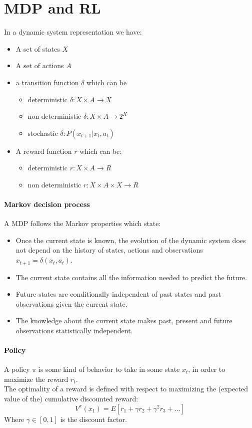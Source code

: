 \section{MDP and RL}
In a dynamic system representation we have:
\begin{itemize}
\item A set of states $X$
\item A set of actions $A$
\item a transition function $\delta$  which can be 
\begin{itemize}
\item deterministic $\delta : X\times A \to X$
\item non deterministic $\delta : X\times A \to 2^X$
\item stochastic $\delta : P(x_{t+1}|x_t,a_t)$
\end{itemize}
\item A reward function $r$ which can be:
\begin{itemize}
\item deterministic $r: X \times A \to R$
\item non deterministic $r: X \times A \times X \to R$
\end{itemize}
\end{itemize}

\paragraph{Markov decision process}
A MDP follows the Markov properties which state:
\begin{itemize}
\item Once the current state is known, the evolution of the dynamic system does not depend on the history of states, actions and observations $x_{t+1}=\delta(x_t,a_t)$.
\item The current state contains all the information needed to predict the future.
\item Future states are conditionally independent of past states and past observations given the current state.
\item The knowledge about the current state makes past, present and future observations statistically independent.
\end{itemize}

\paragraph{Policy}
A policy $\pi$ is some kind of behavior to take in some state $x_t$, in order to maximize the reward $r_t$.\\
The optimality of a reward is defined with respect to maximizing the (expected value of the) cumulative discounted reward:
$$V^{\pi}(x_1)=E[r_1+\gamma r_2+\gamma^2 r_3+\dots]$$
Where $\gamma \in [0,1]$ is the discount factor.